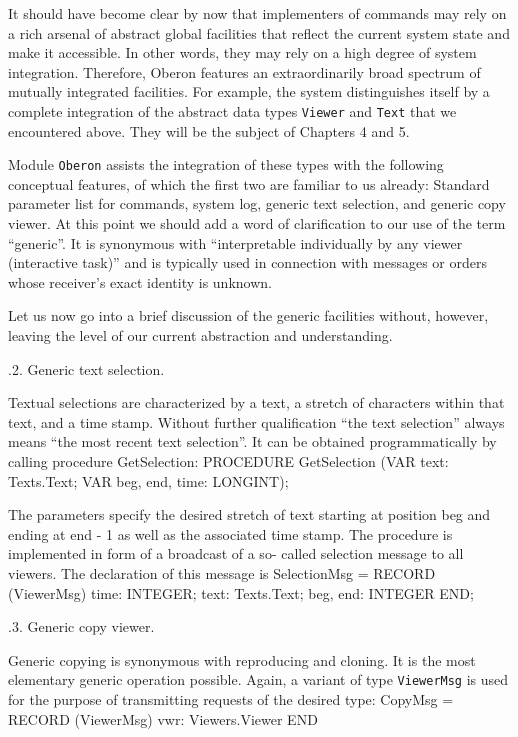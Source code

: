 \noindent It should have become clear by now that implementers of commands may
rely on a rich arsenal of abstract global facilities that reflect the
current system state and make it accessible. In other words, they may
rely on a high degree of system integration. Therefore, Oberon
features an extraordinarily broad spectrum of mutually integrated
facilities. For example, the system distinguishes itself by a complete
integration of the abstract data types {\tt Viewer\/} and {\tt Text\/} that we
encountered above. They will be the subject of Chapters 4 and 5.

Module {\tt Oberon\/} assists the integration of these types with the
following conceptual features, of which the first two are familiar to
us already: Standard parameter list for commands, system log, generic
text selection, and generic copy viewer. At this point we should add a
word of clarification to our use of the term ``generic''. It is
synonymous with ``interpretable individually by any viewer (interactive task)''
and is typically used in connection with messages or orders
whose receiver's exact identity is unknown.

Let us now go into a brief discussion of the generic facilities
without, however, leaving the level of our current abstraction and
understanding.

.2. Generic text selection.

Textual selections are characterized by a text, a stretch of
characters within that text, and a time stamp. Without further
qualification ``the text selection'' always means ``the most recent text selection''.
It can be obtained programmatically by calling procedure GetSelection:
\begintt
PROCEDURE GetSelection (VAR text: Texts.Text;
                        VAR beg, end, time: LONGINT);
\endtt

\noindent The parameters specify the desired stretch of text starting
at position beg and ending at end - 1 as well as the associated time
stamp. The procedure is implemented in form of a broadcast of a so-
called selection message to all viewers. The declaration of this
message is
\begintt
SelectionMsg = RECORD (ViewerMsg)
  time: INTEGER;
  text: Texts.Text;
  beg, end: INTEGER
END;
\endtt

.3. Generic copy viewer.

Generic copying is synonymous with reproducing and cloning. It is the
most elementary generic operation possible. Again, a variant of type
{\tt ViewerMsg\/} is used for the purpose of transmitting requests of the
desired type:
\begintt
CopyMsg = RECORD (ViewerMsg) vwr: Viewers.Viewer END
\endtt 

